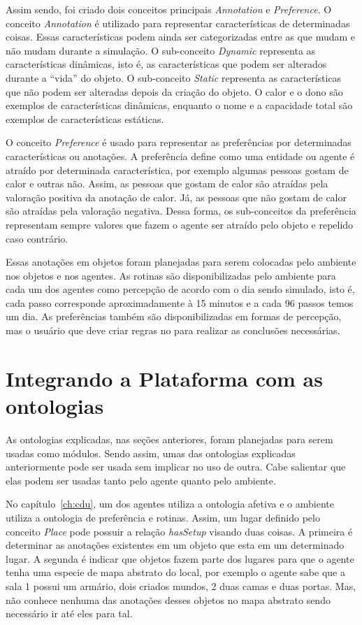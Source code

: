 Assim sendo, foi criado dois conceitos principais \emph{Annotation} e
\emph{Preference}. O conceito \emph{Annotation} é utilizado para representar
características de determinadas coisas. Essas características podem ainda
ser categorizadas entre as que mudam e não mudam durante a simulação. O
sub-conceito \emph{Dynamic} representa as características dinâmicas, isto é,
as características que podem ser alterados durante a ``vida'' do objeto. O
sub-conceito \emph{Static} representa as características que não podem ser
alteradas depois da criação do objeto. O calor e o dono são exemplos de
características dinâmicas, enquanto o nome e a capacidade total são exemplos
de características estáticas.

O conceito \emph{Preference} é usado para representar as preferências por
determinadas características ou anotações. A preferência define como uma entidade ou
agente é atraído por determinada característica, por exemplo algumas pessoas
gostam de calor e outras não. Assim, as pessoas que gostam de calor são
atraídas pela valoração positiva da anotação de calor. Já, as pessoas que não
gostam de calor são atraídas pela valoração negativa. Dessa forma, os
sub-conceitos da preferência representam sempre valores que fazem o agente ser
atraído pelo objeto e repelido caso contrário.

Essas anotações em objetos foram planejadas para serem colocadas pelo ambiente
nos objetos e nos agentes. As rotinas são disponibilizadas pelo ambiente
para cada um dos agentes como percepção de acordo com o dia sendo simulado,
isto é, cada passo corresponde aproximadamente à 15 minutos e a cada 96 passos
temos um dia. As preferências também são disponibilizadas em formas de
percepção, mas o usuário que deve criar regras no \jason para realizar as
conclusões necessárias.

\section{Integrando a Plataforma \jason com as ontologias} \label{ch:p:ipjo}

As ontologias explicadas, nas seções anteriores, foram planejadas para serem
usadas como módulos. Sendo assim, umas das ontologias explicadas anteriormente
pode ser usada sem implicar no uso de outra. Cabe salientar que elas podem ser
usadas tanto pelo agente quanto pelo ambiente.

No capítulo~\ref{ch:cdu}, um dos agentes utiliza a ontologia afetiva e o
ambiente utiliza a ontologia de preferência e rotinas. Assim, um lugar
definido pelo conceito \emph{Place} pode possuir a relação \emph{hasSetup} visando
duas coisas. A primeira é determinar as anotações existentes em um objeto que
esta em um determinado lugar. A segunda é indicar que objetos fazem parte dos
lugares para que o agente tenha uma especie de mapa abstrato do local, por
exemplo o agente sabe que a sala 1 possui um armário, dois criados mundos, 2
duas camas e duas portas. Mas, não conhece nenhuma das anotações desses
objetos no mapa abstrato sendo necessário ir até eles para tal.

